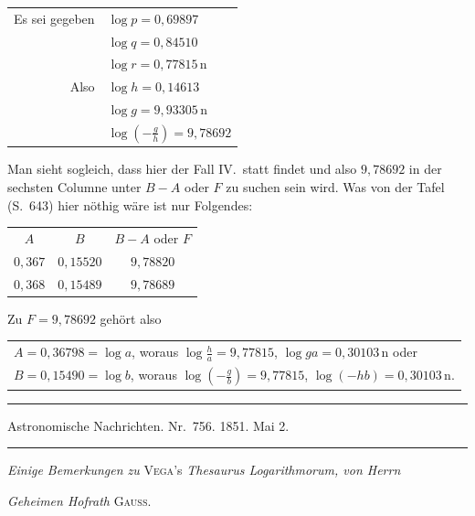 \begin{center}
\begin{tabular}{rl}
Es sei gegeben & $\log p=0{,}69897$ \\
 & $\log q=0{,}84510$ \\
 & $\log r=0{,}77815\,\mathrm{n}$ \\
Also & $\log h=0{,}14613$ \\
 & $\log g=9{,}93305\,\mathrm{n}$ \\
 & $\log(-\frac{g}{h})=9{,}78692$
\end{tabular}
\end{center}

Man sieht sogleich, dass hier der Fall IV.\ statt findet und also $9{,}78692$ in
der sechsten Columne unter $B-A$ oder $F$ zu suchen sein wird. Was von der
Tafel (S.\ 643) hier nöthig wäre ist nur Folgendes:
\begin{center}
\begin{tabular}{c|c|c}
$A$ & $B$ & $B-A$ oder $F$ \\
$0{,}367$ & $0{,}15520$ & $9{,}78820$ \\
$0{,}368$ & $0{,}15489$ & $9{,}78689$
\end{tabular}
\end{center}
Zu $F=9{,}78692$ gehört also
\begin{center}
\begin{tabular}{l}
$A=0{,}36798=\log a$, woraus $\log\frac{h}{a}=9{,}77815$, $\log ga=0{,}30103\,\mathrm{n}$ oder \\
$B=0{,}15490=\log b$, woraus $\log(-\frac{g}{b})=9{,}77815$, $\log(-hb)=0{,}30103\,\mathrm{n}$.
\end{tabular}
\end{center}

\par{}
\begin{center}
\rule{0.7\linewidth}{0.4pt}\par
Astronomische Nachrichten. Nr.\ 756. 1851. Mai 2.\par
\rule{0.7\linewidth}{0.4pt}
\end{center}
\begin{center}\emph{Einige Bemerkungen zu} \textsc{Vega}'s \emph{Thesaurus Logarithmorum, von Herrn}\par
\emph{Geheimen Hofrath} \textsc{Gauss}.\end{center}

